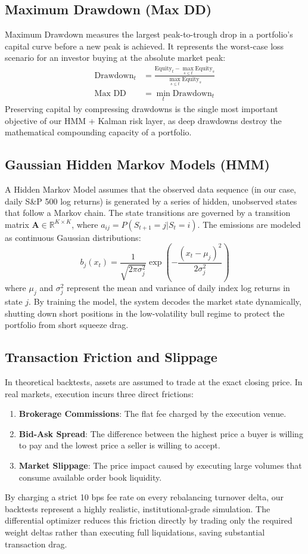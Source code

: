 \documentclass[10pt,journal,compsoc]{IEEEtran}
\begin{document}
\subsection{Maximum Drawdown (Max DD)}
Maximum Drawdown measures the largest peak-to-trough drop in a portfolio's capital curve before a new peak is achieved. It represents the worst-case loss scenario for an investor buying at the absolute market peak:
\begin{align}
\text{Drawdown}_t &= \frac{\text{Equity}_t - \max_{s \le t} \text{Equity}_s}{\max_{s \le t} \text{Equity}_s} \\
\text{Max DD} &= \min_{t} \text{Drawdown}_t
\end{align}
Preserving capital by compressing drawdowns is the single most important objective of our HMM + Kalman risk layer, as deep drawdowns destroy the mathematical compounding capacity of a portfolio.

\subsection{Gaussian Hidden Markov Models (HMM)}
A Hidden Markov Model assumes that the observed data sequence (in our case, daily S\&P 500 log returns) is generated by a series of hidden, unobserved states that follow a Markov chain. The state transitions are governed by a transition matrix $\mathbf{A} \in \mathbb{R}^{K \times K}$, where $a_{ij} = P(S_{t+1} = j | S_t = i)$. The emissions are modeled as continuous Gaussian distributions:
\begin{equation}
b_j(x_t) = \frac{1}{\sqrt{2\pi \sigma_j^2}} \exp\left( -\frac{(x_t - \mu_j)^2}{2\sigma_j^2} \right)
\end{equation}
where $\mu_j$ and $\sigma_j^2$ represent the mean and variance of daily index log returns in state $j$. By training the model, the system decodes the market state dynamically, shutting down short positions in the low-volatility bull regime to protect the portfolio from short squeeze drag.

\subsection{Transaction Friction and Slippage}
In theoretical backtests, assets are assumed to trade at the exact closing price. In real markets, execution incurs three direct frictions:
\begin{enumerate}
    \item \textbf{Brokerage Commissions}: The flat fee charged by the execution venue.
    \item \textbf{Bid-Ask Spread}: The difference between the highest price a buyer is willing to pay and the lowest price a seller is willing to accept.
    \item \textbf{Market Slippage}: The price impact caused by executing large volumes that consume available order book liquidity.
\end{enumerate}
By charging a strict 10 bps fee rate on every rebalancing turnover delta, our backtests represent a highly realistic, institutional-grade simulation. The differential optimizer reduces this friction directly by trading only the required weight deltas rather than executing full liquidations, saving substantial transaction drag.
\end{document}
